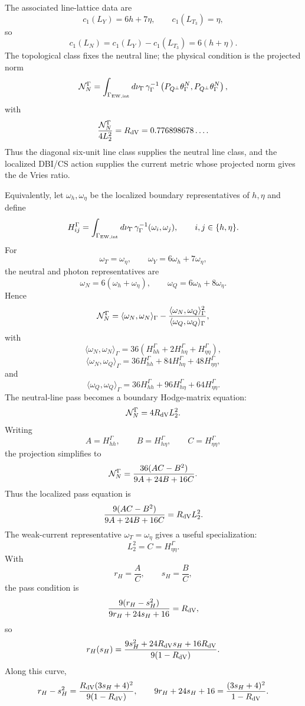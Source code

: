 \documentclass[11pt]{article}
\theoremstyle{definition}
\theoremstyle{remark}
\begin{document}
The associated line-lattice data are
\[
  c_1(L_Y)=6h+7\eta,
  \qquad
  c_1(L_{T_3})=\eta,
\]
so
\[
  c_1(L_N)
  =
  c_1(L_Y)-c_1(L_{T_3})
  =
  6(h+\eta).
\]
The topological class fixes the neutral line; the physical condition is the
projected norm
\[
  {\cal N}_N^\Gamma
  =
  \int_{\Gamma_{\rm EW,int}}d\nu_\Gamma\,
  \gamma_\Gamma^{-1}
  \left(
  P_{Q^\perp}\theta_\Gamma^N,
  P_{Q^\perp}\theta_\Gamma^N
  \right),
\]
with
\[
  \frac{{\cal N}_N^\Gamma}{4L_2^2}
  =
  R_{\rm dV}
  =
  0.776898678\ldots .
\]
Thus the diagonal six-unit line class supplies the neutral line class, and the
localized DBI/CS action supplies the current metric whose projected norm gives
the de Vries ratio.

Equivalently, let \(\omega_h,\omega_\eta\) be the localized boundary
representatives of \(h,\eta\) and define
\[
  H_{ij}^\Gamma
  =
  \int_{\Gamma_{\rm EW,int}}d\nu_\Gamma\,
  \gamma_\Gamma^{-1}(\omega_i,\omega_j),
  \qquad i,j\in\{h,\eta\}.
\]
For
\[
  \omega_T=\omega_\eta,
  \qquad
  \omega_Y=6\omega_h+7\omega_\eta,
\]
the neutral and photon representatives are
\[
  \omega_N=6(\omega_h+\omega_\eta),
  \qquad
  \omega_Q=6\omega_h+8\omega_\eta.
\]
Hence
\[
  {\cal N}_N^\Gamma
  =
  \langle \omega_N,\omega_N\rangle_\Gamma
  -
  \frac{\langle \omega_N,\omega_Q\rangle_\Gamma^2}
       {\langle \omega_Q,\omega_Q\rangle_\Gamma},
\]
with
\[
  \langle \omega_N,\omega_N\rangle_\Gamma
  =
  36\left(H_{hh}^\Gamma+2H_{h\eta}^\Gamma+H_{\eta\eta}^\Gamma\right),
\]
\[
  \langle \omega_N,\omega_Q\rangle_\Gamma
  =
  36H_{hh}^\Gamma+84H_{h\eta}^\Gamma+48H_{\eta\eta}^\Gamma,
\]
and
\[
  \langle \omega_Q,\omega_Q\rangle_\Gamma
  =
  36H_{hh}^\Gamma+96H_{h\eta}^\Gamma+64H_{\eta\eta}^\Gamma.
\]
The neutral-line pass becomes a boundary Hodge-matrix equation:
\[
  {\cal N}_N^\Gamma=4R_{\rm dV}L_2^2.
\]
Writing
\[
  A=H_{hh}^\Gamma,\qquad B=H_{h\eta}^\Gamma,\qquad C=H_{\eta\eta}^\Gamma,
\]
the projection simplifies to
\[
  {\cal N}_N^\Gamma
  =
  \frac{36(AC-B^2)}{9A+24B+16C}.
\]
Thus the localized pass equation is
\[
  \frac{9(AC-B^2)}{9A+24B+16C}
  =
  R_{\rm dV}L_2^2.
\]
The weak-current representative \(\omega_T=\omega_\eta\) gives a useful
specialization:
\[
  L_2^2=C=H_{\eta\eta}^\Gamma.
\]
With
\[
  r_H=\frac{A}{C},\qquad s_H=\frac{B}{C},
\]
the pass condition is
\[
  \frac{9(r_H-s_H^2)}{9r_H+24s_H+16}
  =
  R_{\rm dV},
\]
so
\[
  r_H(s_H)
  =
  \frac{9s_H^2+24R_{\rm dV}s_H+16R_{\rm dV}}
       {9(1-R_{\rm dV})}.
\]
Along this curve,
\[
  r_H-s_H^2
  =
  \frac{R_{\rm dV}(3s_H+4)^2}{9(1-R_{\rm dV})},
  \qquad
  9r_H+24s_H+16
  =
  \frac{(3s_H+4)^2}{1-R_{\rm dV}}.
\]
\end{document}
